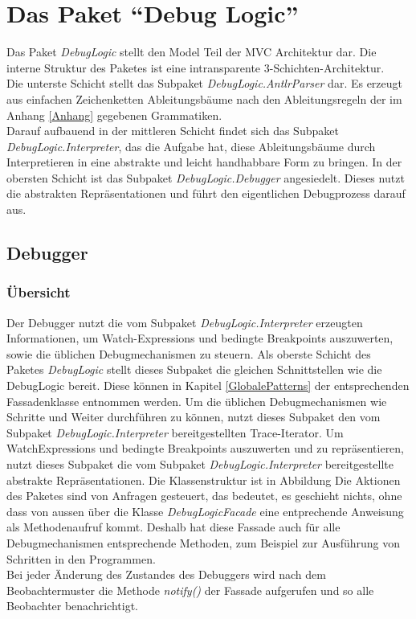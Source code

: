 \documentclass[parskip=full]{scrartcl}
\begin{document}
\section{Das Paket \enquote{Debug Logic}}
\label{DebugLogic}
Das Paket \textit{DebugLogic} stellt den Model Teil der MVC Architektur dar. Die interne Struktur des Paketes ist eine intransparente 3-Schichten-Architektur.\\
Die unterste Schicht stellt das Subpaket \textit{DebugLogic.AntlrParser} dar. Es erzeugt aus einfachen Zeichenketten Ableitungsbäume nach den Ableitungsregeln der im Anhang \ref{Anhang} gegebenen Grammatiken.\\ Darauf aufbauend in der mittleren Schicht findet sich das Subpaket \textit{DebugLogic.Interpreter}, das die Aufgabe hat, diese Ableitungsbäume durch Interpretieren in eine abstrakte und leicht handhabbare Form zu bringen. In der obersten Schicht ist das Subpaket \textit{DebugLogic.Debugger} angesiedelt. Dieses nutzt die abstrakten Repräsentationen und führt den eigentlichen Debugprozess darauf aus.
\subsection{Debugger}
\subsubsection{Übersicht}
Der Debugger nutzt die vom Subpaket \textit{DebugLogic.Interpreter} erzeugten Informationen, um Watch-Expressions und bedingte Breakpoints auszuwerten, sowie die üblichen Debugmechanismen zu steuern.
Als oberste Schicht des Paketes \textit{DebugLogic} stellt dieses Subpaket die gleichen Schnittstellen wie die DebugLogic bereit. Diese können in Kapitel \ref{GlobalePatterns} der entsprechenden Fassadenklasse entnommen werden.
Um die üblichen Debugmechanismen wie Schritte und Weiter durchführen zu können, nutzt dieses Subpaket den vom Subpaket \textit{DebugLogic.Interpreter} bereitgestellten Trace-Iterator. 
Um WatchExpressions und bedingte Breakpoints auszuwerten und zu repräsentieren, nutzt dieses Subpaket die vom Subpaket \textit{DebugLogic.Interpreter} bereitgestellte abstrakte Repräsentationen.
Die Klassenstruktur ist in Abbildung %
Die Aktionen des Paketes sind von Anfragen gesteuert, das bedeutet, es geschieht nichts, ohne dass von aussen über die Klasse \textit{DebugLogicFacade} eine entprechende Anweisung als Methodenaufruf kommt. Deshalb hat diese Fassade auch für alle Debugmechanismen entsprechende Methoden, zum Beispiel zur Ausführung von Schritten in den Programmen. \\
Bei jeder Änderung des Zustandes des Debuggers wird nach dem Beobachtermuster die Methode \textit{notify()} der Fassade aufgerufen und so alle Beobachter benachrichtigt.
\end{document}
